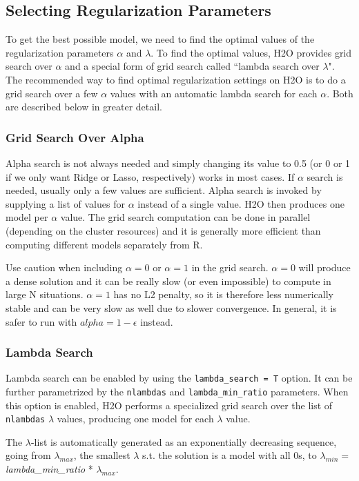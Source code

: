 \subsection{Selecting Regularization Parameters}
To get the best possible model, we need to find the optimal values of the regularization parameters $\alpha$ and $\lambda$. 
To find the optimal values, H2O provides grid search over $\alpha$ and a special form of grid search called ``lambda search over $\lambda$". The recommended way to find optimal regularization settings on H2O is to do a grid search over a few $\alpha$ values with an automatic lambda search for each $\alpha$. Both are described below in greater detail. 
\subsubsection{Grid Search Over Alpha}
Alpha search is not always needed and simply changing its value to 0.5 (or 0 or 1 if we only want Ridge or Lasso, respectively) works in most cases. If $\alpha$ search is needed, usually only a few values are sufficient. Alpha search is invoked by supplying a list of values for $\alpha$ instead of a single value. H2O then produces one model per $\alpha$ value. The grid search computation can be done in parallel (depending on the cluster resources) and it is generally more efficient than computing different models separately from R. 

Use caution when including $\alpha=0$ or $\alpha=1$ in the grid search. $\alpha=0$ will produce a dense solution and it can be really slow (or even impossible) to compute in large N situations. $\alpha=1$ has no L2 penalty, so it is therefore less numerically stable and can be very slow as well due to slower convergence. In general, it is safer to run with $alpha=1-\epsilon$ instead.

\subsubsection{Lambda Search}  %
Lambda search can be enabled by using the \texttt{lambda\_search = T} option. It can be further parametrized by the \texttt{nlambdas} and \texttt{lambda\_min\_ratio} parameters. When this option is enabled, H2O performs a specialized grid search over the list of \texttt{nlambdas} $\lambda$ values, producing one model for each $\lambda$ value. 

The $\lambda$-list is automatically generated as an exponentially decreasing sequence, going from $\lambda_{max}$,
the smallest $\lambda$ s.t. the solution is a model with all 0s, to $\lambda_{min} = $ \textit{lambda\_min\_ratio} * $ \lambda_{max}$. %


